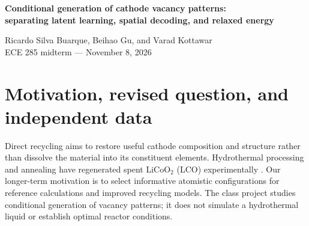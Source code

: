 \documentclass[10pt]{article}
\begin{document}
\begin{center}
{\Large\bfseries Conditional generation of cathode vacancy patterns:\\
separating latent learning, spatial decoding, and relaxed energy}\par\vspace{4 pt}
Ricardo Silva Buarque, Beihao Gu, and Varad Kottawar\\
ECE 285 midterm --- November 8, 2026
\end{center}
\begin{abstract}
We test whether a conditional variational autoencoder (CVAE) proposes new
Li/vacancy configurations at a requested composition and energy range more
efficiently than uniform sampling and mutation. Earlier spatial decoding improved
teacher-defined yield, but its latent variables were nearly unused. The present
matched controls separate a graph-posterior CVAE, a no-latent autoregressive
sampler, and a dense-posterior CVAE with the same causal spatial decoder.
Thirty-seven 4,000-update fits are complete. Development evidence shows spatial AR matches
the graph CVAE, while a dense posterior retains information without useful
prior-generation gain. On frozen FINAL proposals, radial-shell AR achieves
63.04\% UMA balanced novel in-bin yield, versus 62.20\% for its CVAE and
58.37\% for mutation. A separate 6,000-mask cohort compares deletion and
relaxed-endpoint targets; endpoint-label training does not improve endpoint
LOW yield in the matched test. Exhaustive small-cell
enumeration quantifies approximate symmetry and teacher disagreement. No new DFT
or interatomic-potential fine-tuning is performed, and generative, numerical, and
physical validation remain distinct.
\end{abstract}

\section{Motivation, revised question, and independent data}
Direct recycling aims to restore useful cathode composition and structure rather
than dissolve the material into its constituent elements. Hydrothermal processing
and annealing have regenerated spent LiCoO$_2$ (LCO) experimentally
\cite{shi2018}. Our longer-term motivation is to select informative atomistic
configurations for reference calculations and improved recycling models.
The class project studies conditional generation of vacancy patterns; it does not
simulate a hydrothermal liquid or establish optimal reactor conditions.
\end{document}

